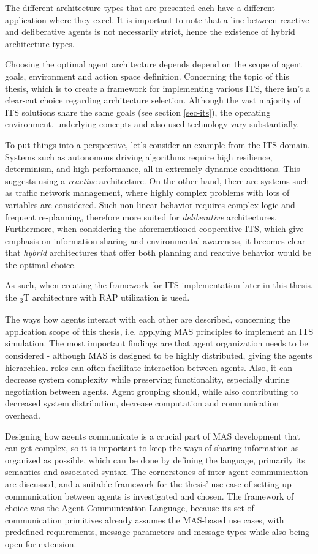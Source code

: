 \documentclass[0main.tex]{subfiles}
\begin{document}
The different architecture types that are presented each have a different application where 
they excel. It is important to note that a line between reactive and deliberative agents 
is not necessarily strict, hence the existence of hybrid architecture types. 

Choosing the optimal agent architecture depends depend on the scope of agent goals, 
environment and action space definition. Concerning the topic of this thesis, which is to 
create a framework for implementing various ITS, there isn't a clear-cut choice regarding 
architecture selection. Although the vast majority of ITS solutions share the same goals (see section \ref{sec-its}), 
the operating environment, underlying concepts and also used technology vary substantially.

To put things into a perspective, let's consider an example from the ITS domain. 
Systems such as autonomous driving algorithms require high resilience, determinism, 
and high performance, all in extremely dynamic conditions. This suggests using a
\emph{reactive} architecture. On the other hand, there are systems such as traffic network management, 
where highly complex problems with lots of variables are considered. Such non-linear behavior 
requires complex logic and frequent re-planning, therefore more suited for \emph{deliberative}
architectures. Furthermore, when considering the aforementioned cooperative ITS, which give emphasis 
on information sharing and environmental awareness, it becomes clear that \emph{hybrid} 
architectures that offer both planning and reactive behavior would be the optimal choice.

As such, when creating the framework for ITS implementation later in this thesis, the
\textsubscript{3}T architecture with RAP utilization is used.  

The ways how agents interact with each other are described, concerning the application scope of
this thesis, i.e. applying MAS principles to implement an ITS simulation. The most important
findings are that agent organization needs to be considered - although MAS is designed to be
highly distributed, giving the agents hierarchical roles can often facilitate interaction
between agents. Also, it can decrease system complexity while preserving functionality, especially
during negotiation between agents. Agent grouping should, while also contributing to decreased
system distribution, decrease computation and communication overhead. 

Designing how agents communicate is a crucial part of MAS development
that can get complex, so it is important to keep the ways of sharing information as organized
as possible, which can be done by defining the language, primarily its semantics and associated
syntax. The cornerstones of inter-agent communication are discussed, and a suitable framework
for the thesis' use case of setting up communication between agents is investigated and
chosen. The framework of choice was the Agent Communication Language, because its set of
communication primitives already assumes the MAS-based use cases, with predefined requirements,
message parameters and message types while also being open for extension.
\end{document}
